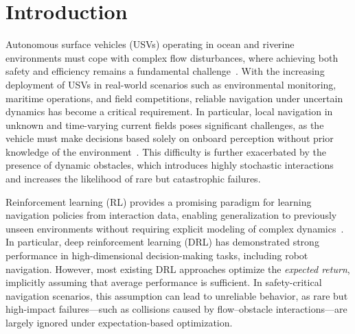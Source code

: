 \documentclass[runningheads]{llncs}
\begin{document}
\section{Introduction}

Autonomous surface vehicles (USVs) operating in ocean and riverine environments must cope with complex flow disturbances, where achieving both safety and efficiency remains a fundamental challenge~\cite{ref1}. 
With the increasing deployment of USVs in real-world scenarios such as environmental monitoring, maritime operations, and field competitions, reliable navigation under uncertain dynamics has become a critical requirement. 
In particular, local navigation in unknown and time-varying current fields poses significant challenges, as the vehicle must make decisions based solely on onboard perception without prior knowledge of the environment~\cite{ref5}. 
This difficulty is further exacerbated by the presence of dynamic obstacles, which introduces highly stochastic interactions and increases the likelihood of rare but catastrophic failures.

Reinforcement learning (RL) provides a promising paradigm for learning navigation policies from interaction data, enabling generalization to previously unseen environments without requiring explicit modeling of complex dynamics~\cite{ref6}. 
In particular, deep reinforcement learning (DRL) has demonstrated strong performance in high-dimensional decision-making tasks, including robot navigation. 
However, most existing DRL approaches optimize the \emph{expected return}, implicitly assuming that average performance is sufficient. 
In safety-critical navigation scenarios, this assumption can lead to unreliable behavior, as rare but high-impact failures—such as collisions caused by flow--obstacle interactions—are largely ignored under expectation-based optimization.
\end{document}
